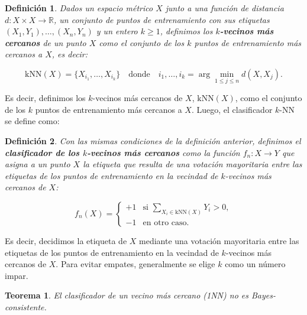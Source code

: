\documentclass{article}
\newtheorem{thm}{Teorema}[subsection]
\newtheorem{dfn}{Definición}[subsection]
\begin{document}
\begin{dfn}
    Dados un espacio métrico \(X\) junto a una función de distancia \(d : X \times X \to \mathbb{R}\), 
    un conjunto de puntos de entrenamiento con sus etiquetas \((X_1, Y_1), \dots, (X_n, Y_n)\) y un entero \(k \geq 1\), 
    definimos los \textbf{\(k\)-vecinos más cercanos} de un punto \(X\) como el conjunto de los \(k\) puntos 
    de entrenamiento más cercanos a \(X\), es decir:

    \[
    \text{kNN}(X) = \{X_{i_1}, \dots, X_{i_k}\} \quad \text{donde} \quad i_1, \dots, i_k = \arg\min_{1 \leq j \leq n} d(X, X_j).
    \]
\end{dfn}

Es decir, definimos los 
\(k\)-vecinos más cercanos de \(X\), \(\text{kNN}(X)\), como el conjunto de los \(k\) puntos de 
entrenamiento más cercanos a \(X\). Luego, el clasificador \(k\)-NN se define como:

\begin{dfn}
    Con las mismas condiciones de la definición anterior,
    definimos el \textbf{clasificador de los \(k\)-vecinos más cercanos} como la función \(f_n : X \to Y\) 
    que asigna a un punto \(X\) la etiqueta que resulta de una votación mayoritaria entre las etiquetas 
    de los puntos de entrenamiento en la vecindad de \(k\)-vecinos más cercanos de \(X\):


    \[
f_n(X) = 
\begin{cases} 
+1 & \text{si } \underset{{X_i \in \text{kNN}(X)}}{\sum}Y_i > 0, \\ 
-1 & \text{en otro caso}.
\end{cases}
\]
\end{dfn}


Es decir, decidimos la etiqueta de \(X\) mediante una votación mayoritaria entre las etiquetas de los 
puntos de entrenamiento en la vecindad de \(k\)-vecinos más cercanos de \(X\). Para evitar empates, 
generalmente se elige \(k\) como un número impar.\newline


\begin{thm}
    El clasificador de un vecino más cercano (1NN) no es Bayes-consistente.
\end{thm}
\end{document}
